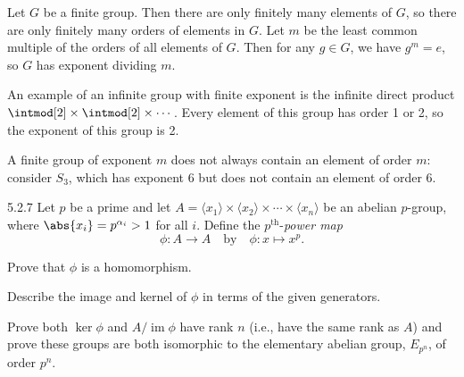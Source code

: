 \begin{sol}
    Let $G$ be a finite group.
	Then there are only finitely many elements of $G$, so there are only finitely many orders of elements in $G$.
	Let $m$ be the least common multiple of the orders of all elements of $G$.
	Then for any $g \in G$, we have $g^m = e$, so $G$ has exponent dividing $m$.
    
    An example of an infinite group with finite exponent is the infinite direct product $\intmod[2] \times \intmod[2] \times \cdots$.
	Every element of this group has order 1 or 2, so the exponent of this group is 2.
    
    A finite group of exponent $m$ does not always contain an element of order $m$: consider $S_3$, which has exponent 6 but does not contain an element of order 6.
\end{sol}

\begin{exercise}{5.2.7}
    Let $p$ be a prime and let $A = \langle x_1 \rangle \times \langle x_2 \rangle \times \cdots \times \langle x_n \rangle$ be an abelian $p$-group, where $\abs{x_i} = p^{\alpha_i} > 1$ for all $i$.
	Define the $p^{\text{th}}$-\emph{power map}
    \[
    	\phi \colon A \to A \quad \text{by} \quad \phi \colon x \mapsto x^p.
    \]
    \begin{subexercises}
        \item Prove that $\phi$ is a homomorphism.
        \item Describe the image and kernel of $\phi$ in terms of the given generators.
        \item Prove both $\ker \phi$ and $A / \operatorname{im} \phi$ have rank $n$ (i.e., have the same rank as $A$) and prove these groups are both isomorphic to the elementary abelian group, $E_{p^n}$, of order $p^n$.
    \end{subexercises}
\end{exercise}

